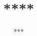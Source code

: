 \documentclass[openany]{book}
\begin{document}
\title{****}
\author{***}
\maketitle
\newpage
\tableofcontents
\newpage
\end{document}
